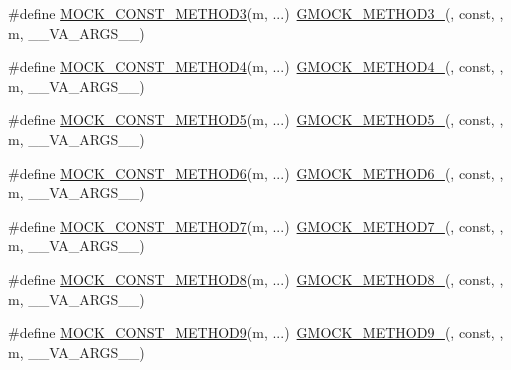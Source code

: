 \begin{DoxyCompactItemize}
\item 
\#define \hyperlink{gmock-generated-function-mockers_8h_a9e67763df6705172e1a2ae92f1446bbc}{M\+O\+C\+K\+\_\+\+C\+O\+N\+S\+T\+\_\+\+M\+E\+T\+H\+O\+D3}(m, ...)~\hyperlink{gmock-generated-function-mockers_8h_af7c77ba511c631de02bb8c45a6ed3045}{G\+M\+O\+C\+K\+\_\+\+M\+E\+T\+H\+O\+D3\+\_\+}(, const, , m, \+\_\+\+\_\+\+V\+A\+\_\+\+A\+R\+G\+S\+\_\+\+\_\+)
\item 
\#define \hyperlink{gmock-generated-function-mockers_8h_a4614e9d6b24dff60c30dd4dedf494c6c}{M\+O\+C\+K\+\_\+\+C\+O\+N\+S\+T\+\_\+\+M\+E\+T\+H\+O\+D4}(m, ...)~\hyperlink{gmock-generated-function-mockers_8h_ab6430f2cfad9de4aca5258ea559294bb}{G\+M\+O\+C\+K\+\_\+\+M\+E\+T\+H\+O\+D4\+\_\+}(, const, , m, \+\_\+\+\_\+\+V\+A\+\_\+\+A\+R\+G\+S\+\_\+\+\_\+)
\item 
\#define \hyperlink{gmock-generated-function-mockers_8h_ab7021ec2b869e7c9ea90363ee675f19b}{M\+O\+C\+K\+\_\+\+C\+O\+N\+S\+T\+\_\+\+M\+E\+T\+H\+O\+D5}(m, ...)~\hyperlink{gmock-generated-function-mockers_8h_a9e3ecd392499ab19a4a6d3adcabf56f6}{G\+M\+O\+C\+K\+\_\+\+M\+E\+T\+H\+O\+D5\+\_\+}(, const, , m, \+\_\+\+\_\+\+V\+A\+\_\+\+A\+R\+G\+S\+\_\+\+\_\+)
\item 
\#define \hyperlink{gmock-generated-function-mockers_8h_a5081a185ba264d599357398952c23af1}{M\+O\+C\+K\+\_\+\+C\+O\+N\+S\+T\+\_\+\+M\+E\+T\+H\+O\+D6}(m, ...)~\hyperlink{gmock-generated-function-mockers_8h_ad0ca7f6973a076d0af4c953f8ed91842}{G\+M\+O\+C\+K\+\_\+\+M\+E\+T\+H\+O\+D6\+\_\+}(, const, , m, \+\_\+\+\_\+\+V\+A\+\_\+\+A\+R\+G\+S\+\_\+\+\_\+)
\item 
\#define \hyperlink{gmock-generated-function-mockers_8h_a0f0e63ed14beab1d85f0160bdbed9930}{M\+O\+C\+K\+\_\+\+C\+O\+N\+S\+T\+\_\+\+M\+E\+T\+H\+O\+D7}(m, ...)~\hyperlink{gmock-generated-function-mockers_8h_ab98a8399ba62b53b375c2807f4d39d2f}{G\+M\+O\+C\+K\+\_\+\+M\+E\+T\+H\+O\+D7\+\_\+}(, const, , m, \+\_\+\+\_\+\+V\+A\+\_\+\+A\+R\+G\+S\+\_\+\+\_\+)
\item 
\#define \hyperlink{gmock-generated-function-mockers_8h_a614ee58b7c9ab72e90c850d4bb97a502}{M\+O\+C\+K\+\_\+\+C\+O\+N\+S\+T\+\_\+\+M\+E\+T\+H\+O\+D8}(m, ...)~\hyperlink{gmock-generated-function-mockers_8h_aa84a36427c44505207b7cad5dec7ad67}{G\+M\+O\+C\+K\+\_\+\+M\+E\+T\+H\+O\+D8\+\_\+}(, const, , m, \+\_\+\+\_\+\+V\+A\+\_\+\+A\+R\+G\+S\+\_\+\+\_\+)
\item 
\#define \hyperlink{gmock-generated-function-mockers_8h_ab7429646bacf56a7d560a3d81d497880}{M\+O\+C\+K\+\_\+\+C\+O\+N\+S\+T\+\_\+\+M\+E\+T\+H\+O\+D9}(m, ...)~\hyperlink{gmock-generated-function-mockers_8h_aa820171a19cc587c247dbe05cbffc55f}{G\+M\+O\+C\+K\+\_\+\+M\+E\+T\+H\+O\+D9\+\_\+}(, const, , m, \+\_\+\+\_\+\+V\+A\+\_\+\+A\+R\+G\+S\+\_\+\+\_\+)

\end{DoxyCompactItemize}
